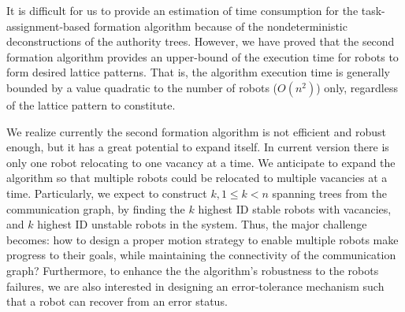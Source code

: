It is difficult for us to provide an estimation of time consumption for the task-assignment-based formation algorithm because of the nondeterministic deconstructions of the authority trees. 
%
However, we have proved that the second formation algorithm provides an upper-bound of the execution time for robots to form desired lattice patterns.  
%
That is, the algorithm execution time is generally bounded by a value quadratic to the number of robots ($O(n^2)$) only, regardless of the lattice pattern to constitute.


We realize currently the second formation algorithm is not efficient and robust enough,  but it has a great potential to expand itself. 
%
In current version there is only one robot relocating to one vacancy at a time. 
%
We anticipate to expand the algorithm so that multiple robots could be
relocated to multiple vacancies at a time. 
%
Particularly, we expect to construct $k, 1\leq k < n$ spanning trees from the communication graph, by finding the $k$ highest ID stable robots with vacancies,
and $k$ highest ID unstable robots in the system.
Thus, the major challenge becomes: how to design a proper motion strategy to enable multiple robots make progress to their goals, while maintaining the connectivity of the communication graph?
%
Furthermore, to enhance the the algorithm's robustness to the robots failures, we are also interested in designing an error-tolerance mechanism such that a robot can recover from an error status.